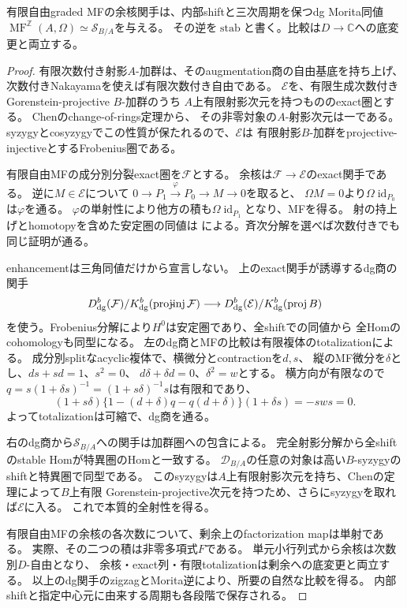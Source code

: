 \begin{lemma}[enhancedな余核比較]\label{fdw:lem:stabilization}
有限自由graded MFの余核関手は、内部shiftと三次周期を保つdg Morita同値
$\operatorname{MF}^{\mathbb Z}(A,\Omega)\simeq\mathcal S_{B/A}$を与える。
その逆を$\operatorname{stab}$と書く。比較は$D\to\mathbb C$への底変更と両立する。
\end{lemma}
\begin{proof}
有限次数付き射影$A$-加群は、そのaugmentation商の自由基底を持ち上げ、
次数付きNakayamaを使えば有限次数付き自由である。
$\mathcal E$を、有限生成次数付きGorenstein-projective $B$-加群のうち
$A$上有限射影次元を持つもののexact圏とする。
Chenのchange-of-rings定理\cite[Theorem~2.10, Corollary~2.11]{AMChen}から、
その非零対象の$A$-射影次元は一である。
syzygyとcosyzygyでこの性質が保たれるので、$\mathcal E$は
有限射影$B$-加群をprojective-injectiveとするFrobenius圏である。

有限自由MFの成分別分裂exact圏を$\mathcal F$とする。
余核は$\mathcal F\to\mathcal E$のexact関手である。
逆に$M\in\mathcal E$について
$0\to P_1\xrightarrow{\varphi}P_0\to M\to0$を取ると、
$\Omega M=0$より$\Omega\operatorname{id}_{P_0}$は$\varphi$を通る。
$\varphi$の単射性により他方の積も$\Omega\operatorname{id}_{P_1}$となり、MFを得る。
射の持上げとhomotopyを含めた安定圏の同値は
\cite[Theorem~7.2]{AMChen}による。斉次分解を選べば次数付きでも同じ証明が通る。

enhancementは三角同値だけから宣言しない。
上のexact関手が誘導するdg商の関手
\[
 D^b_{\rm dg}(\mathcal F)/K^b_{\rm dg}(\operatorname{proj\!-\!inj}\mathcal F)
 \longrightarrow
 D^b_{\rm dg}(\mathcal E)/K^b_{\rm dg}(\operatorname{proj}B)
\]
を使う。Frobenius分解により$H^0$は安定圏であり、全shiftでの同値から
全Homのcohomologyも同型になる。
左のdg商とMFの比較は有限複体のtotalizationによる。
成分別splitなacyclic複体で、横微分とcontractionを$d,s$、
縦のMF微分を$\delta$とし、$ds+sd=1$、$s^2=0$、
$d\delta+\delta d=0$、$\delta^2=w$とする。
横方向が有限なので$q=s(1+\delta s)^{-1}=(1+s\delta)^{-1}s$は有限和であり、
\[
 (1+s\delta)\{1-(d+\delta)q-q(d+\delta)\}(1+\delta s)
 =-sws=0.
\]
よってtotalizationは可縮で、dg商を通る。

右のdg商から$\mathcal S_{B/A}$への関手は加群圏への包含による。
完全射影分解から全shiftのstable Homが特異圏のHomと一致する。
$\mathcal D_{B/A}$の任意の対象は高い$B$-syzygyのshiftと特異圏で同型である。
このsyzygyは$A$上有限射影次元を持ち、Chenの定理によって$B$上有限
Gorenstein-projective次元を持つため、さらにsyzygyを取れば$\mathcal E$に入る。
これで本質的全射性を得る。

有限自由MFの余核の各次数について、剰余上のfactorization mapは単射である。
実際、その二つの積は非零多項式$F$である。
単元小行列式から余核は次数別$D$-自由となり、
余核・exact列・有限totalizationは剰余への底変更と両立する。
以上のdg関手のzigzagとMorita逆により、所要の自然な比較を得る。
内部shiftと指定中心元に由来する周期も各段階で保存される。
\end{proof}

